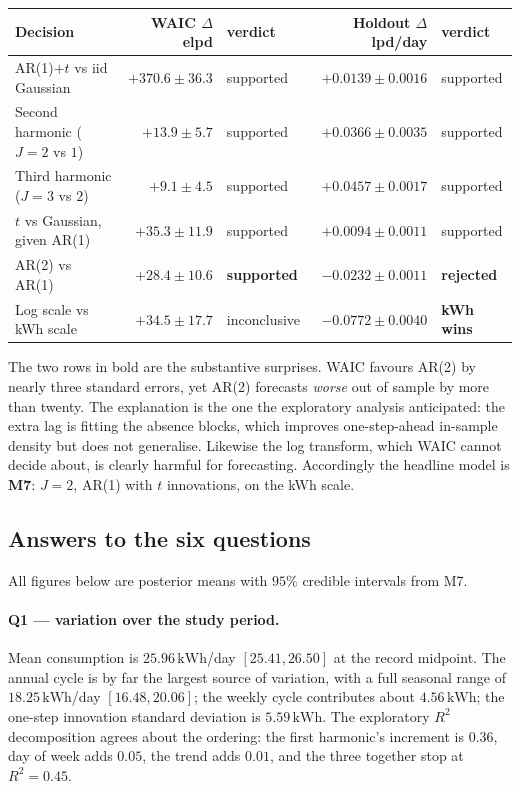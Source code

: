 \documentclass[11pt]{article}
\newcommand{\kwh}{\,\mathrm{kWh}}
\begin{document}
\begin{center}
\small
\begin{tabular}{@{}lrlrl@{}}
\toprule
Decision & WAIC $\Delta$elpd & verdict & Holdout $\Delta$lpd/day & verdict \\
\midrule
AR(1)$+t$ vs iid Gaussian     & $+370.6 \pm 36.3$ & supported   & $+0.0139 \pm 0.0016$ & supported \\
Second harmonic ($J{=}2$ vs $1$) & $+13.9 \pm 5.7$  & supported   & $+0.0366 \pm 0.0035$ & supported \\
Third harmonic ($J{=}3$ vs $2$)  & $+9.1 \pm 4.5$   & supported   & $+0.0457 \pm 0.0017$ & supported \\
$t$ vs Gaussian, given AR(1)  & $+35.3 \pm 11.9$  & supported   & $+0.0094 \pm 0.0011$ & supported \\
AR(2) vs AR(1)                & $+28.4 \pm 10.6$  & \textbf{supported} & $\mathbf{-0.0232 \pm 0.0011}$ & \textbf{rejected} \\
Log scale vs kWh scale        & $+34.5 \pm 17.7$  & inconclusive & $\mathbf{-0.0772 \pm 0.0040}$ & \textbf{kWh wins} \\
\bottomrule
\end{tabular}
\end{center}

The two rows in bold are the substantive surprises. WAIC favours AR(2) by
nearly three standard errors, yet AR(2) forecasts \emph{worse} out of sample by
more than twenty. The explanation is the one the exploratory analysis
anticipated: the extra lag is fitting the absence blocks, which improves
one-step-ahead in-sample density but does not generalise. Likewise the log
transform, which WAIC cannot decide about, is clearly harmful for forecasting.
Accordingly the headline model is \textbf{M7}: $J{=}2$, AR(1) with $t$
innovations, on the kWh scale.

\subsection{Answers to the six questions}

All figures below are posterior means with $95\%$ credible intervals from M7.

\paragraph{Q1 --- variation over the study period.} Mean consumption is
$25.96\kwh$/day $[25.41, 26.50]$ at the record midpoint. The annual cycle is by
far the largest source of variation, with a full seasonal range of
$18.25\kwh$/day $[16.48, 20.06]$; the weekly cycle contributes about
$4.56\kwh$; the one-step innovation standard deviation is $5.59\kwh$.
The exploratory $R^2$ decomposition agrees about the ordering: the first
harmonic's increment is $0.36$, day of week adds $0.05$, the trend adds
$0.01$, and the three together stop at $R^2 = 0.45$.
\end{document}
